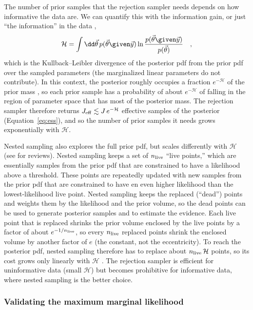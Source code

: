 \documentclass[twocolumn]{AASTeX7/aastex701}
\begin{document}
The number of prior samples that the rejection sampler needs depends on how informative
the data are.
We can quantify this with the information gain, or just ``the information'' in the data
\citep{Skilling:2006},
\begin{equation}
  \mathcal{H} = \int \dd\vec{\theta}\, p(\vec{\theta} \given \vec{y})
    \ln \frac{p(\vec{\theta} \given \vec{y})}{p(\vec{\theta})}
  \quad ,
  \label{eq:information}
\end{equation}
which is the Kullback--Leibler divergence of the posterior pdf from the prior pdf over
the sampled parameters (the marginalized linear parameters do not contribute).
In this context, the posterior roughly occupies a fraction $e^{-\mathcal{H}}$ of the
prior mass \citep{Skilling:2006}, so each prior sample has a probability of about
$e^{-\mathcal{H}}$ of falling in the region of parameter space that has most of the
posterior mass.
The rejection sampler therefore returns $J_{\rm eff} \lesssim J\,e^{-\mathcal{H}}$
effective samples of the posterior (Equation~\ref{eq:ess}), and so the number of prior
samples it needs grows exponentially with $\mathcal{H}$.

Nested sampling \citep{Skilling:2004, Skilling:2006} also explores the full prior pdf,
but scales differently with $\mathcal{H}$ (see \citealt{Ashton:2022, Buchner:2023} for
reviews).
Nested sampling keeps a set of $n_{\rm live}$ ``live points,'' which are essentially
samples from the prior pdf that are constrained to have a likelihood above a threshold.
These points are repeatedly updated with new samples from the prior pdf that are
constrained to have en even higher likelihood than the lowest-likelihood live point.
Nested sampling keeps the replaced (``dead'') points and weights them by the likelihood
and the prior volume, so the dead points can be used to generate posterior samples and
to estimate the evidence.
Each live point that is replaced shrinks the prior volume enclosed by the live points by
a factor of about $e^{-1/n_{\rm live}}$, so every $n_{\rm live}$ replaced points shrink
the enclosed volume by another factor of $e$ (the constant, not the eccentricity).
To reach the posterior pdf, nested sampling therefore has to replace about
$n_{\rm live}\,\mathcal{H}$ points, so its cost grows only linearly with $\mathcal{H}$
\citep{Skilling:2006}.
The rejection sampler is efficient for uninformative data (small $\mathcal{H}$) but
becomes prohibitive for informative data, where nested sampling is the better choice.


\subsubsection{Validating the maximum marginal likelihood}
\label{sec:methods-gmax}
\end{document}
